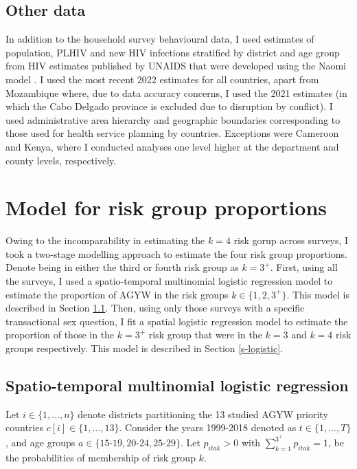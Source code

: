 \documentclass[a4paper, nobind]{templates/ociamthesis}
\begin{document}
\hypertarget{other-data}{%
\subsection{Other data}\label{other-data}}

In addition to the household survey behavioural data, I used estimates of population, PLHIV and new HIV infections stratified by district and age group from HIV estimates published by UNAIDS that were developed using the Naomi model \autocite{eaton2021naomi}.
I used the most recent 2022 estimates for all countries, apart from Mozambique where, due to data accuracy concerns, I used the 2021 estimates (in which the Cabo Delgado province is excluded due to disruption by conflict).
I used administrative area hierarchy and geographic boundaries corresponding to those used for health service planning by countries.
Exceptions were Cameroon and Kenya, where I conducted analyses one level higher at the department and county levels, respectively.

\hypertarget{model-for-risk-group-proportions}{%
\section{Model for risk group proportions}\label{model-for-risk-group-proportions}}

Owing to the incomparability in estimating the \(k = 4\) risk gorup across surveys, I took a two-stage modelling approach to estimate the four risk group proportions.
Denote being in either the third or fourth risk group as \(k = 3^{+}\).
First, using all the surveys, I used a spatio-temporal multinomial logistic regression model to estimate the proportion of AGYW in the risk groups \(k \in \{1, 2, 3^{+}\}\).
This model is described in Section \ref{st-multinomial}.
Then, using only those surveys with a specific transactional sex question, I fit a spatial logistic regression model to estimate the proportion of those in the \(k = 3^{+}\) risk group that were in the \(k = 3\) and \(k = 4\) risk groups respectively.
This model is described in Section \ref{s-logistic}.

\hypertarget{st-multinomial}{%
\subsection{Spatio-temporal multinomial logistic regression}\label{st-multinomial}}

Let \(i \in \{1, \ldots, n\}\) denote districts partitioning the 13 studied AGYW priority countries \(c[i] \in \{1, \ldots, 13\}\).
Consider the years 1999-2018 denoted as \(t \in \{1, \ldots, T\}\), and age groups \(a \in \{\text{15-19}, \text{20-24}, \text{25-29}\}\).
Let \(p_{itak} > 0\) with \(\sum_{k = 1}^{3^{+}} p_{itak} = 1\), be the probabilities of membership of risk group \(k\).
\end{document}
